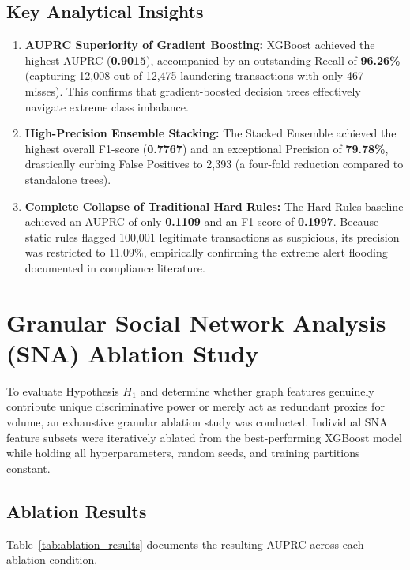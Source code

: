\subsection{Key Analytical Insights}
\begin{enumerate}
    \item \textbf{AUPRC Superiority of Gradient Boosting:} XGBoost achieved the highest AUPRC (\textbf{0.9015}), accompanied by an outstanding Recall of \textbf{96.26\%} (capturing 12,008 out of 12,475 laundering transactions with only 467 misses). This confirms that gradient-boosted decision trees effectively navigate extreme class imbalance.
    \item \textbf{High-Precision Ensemble Stacking:} The Stacked Ensemble achieved the highest overall F1-score (\textbf{0.7767}) and an exceptional Precision of \textbf{79.78\%}, drastically curbing False Positives to 2,393 (a four-fold reduction compared to standalone trees).
    \item \textbf{Complete Collapse of Traditional Hard Rules:} The Hard Rules baseline achieved an AUPRC of only \textbf{0.1109} and an F1-score of \textbf{0.1997}. Because static rules flagged 100,001 legitimate transactions as suspicious, its precision was restricted to 11.09\%, empirically confirming the extreme alert flooding documented in compliance literature.
\end{enumerate}

\section{Granular Social Network Analysis (SNA) Ablation Study}
To evaluate Hypothesis $H_1$ and determine whether graph features genuinely contribute unique discriminative power or merely act as redundant proxies for volume, an exhaustive granular ablation study was conducted. Individual SNA feature subsets were iteratively ablated from the best-performing XGBoost model while holding all hyperparameters, random seeds, and training partitions constant.

\subsection{Ablation Results}
Table~\ref{tab:ablation_results} documents the resulting AUPRC across each ablation condition.

